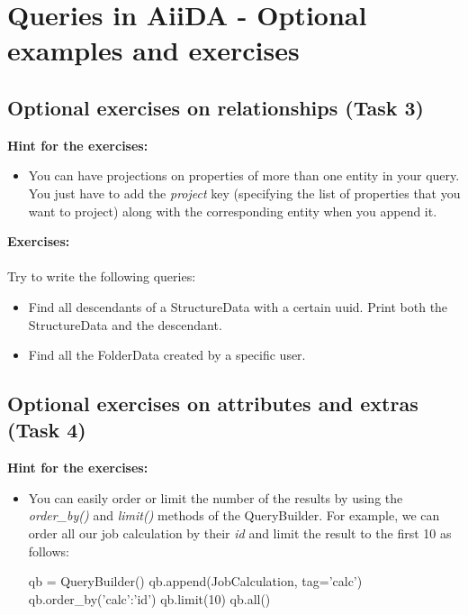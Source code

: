 \section{Queries in AiiDA - Optional examples and exercises}


\subsection*{Optional exercises on relationships (Task 3)}
\textbf{Hint for the exercises:}
\begin{itemize}
\item You can have projections on properties of more than one entity in your query. You just have to add the \emph{project} key (specifying the list of properties that you want to project) along with the corresponding entity when you append it.
\end{itemize}

\begin{tcolorbox}
\textbf{Exercises:}\\~\\
Try to write the following queries:
\begin{itemize}
	\item Find all descendants of a StructureData with a certain uuid. Print both the StructureData and the descendant.
	\item Find all the FolderData created by a specific user.
\end{itemize}
\end{tcolorbox}

\subsection*{Optional exercises on attributes and extras (Task 4)}
\textbf{Hint for the exercises:}
\begin{itemize}
\item You can easily order or limit the number of the results by using the \emph{order\_by()} and \emph{limit()} methods of the QueryBuilder. For example, we can order all our job calculation by their \textit{id} and limit the result to the first 10 as follows:
\begin{pythoncommand}
qb = QueryBuilder()
qb.append(JobCalculation, tag='calc')
qb.order_by({'calc':'id'})
qb.limit(10)
qb.all()
\end{pythoncommand}
\end{itemize}

